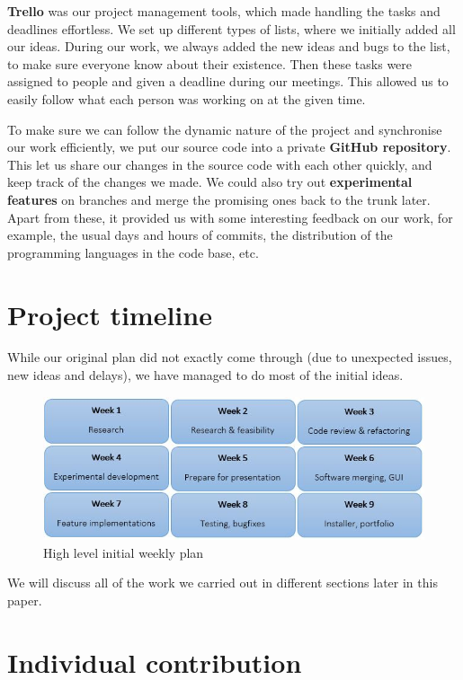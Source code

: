 \documentclass[a4paper, 11pt, article]{report}
\begin{document}
\textbf{Trello} was our project management tools, which made handling the tasks and deadlines effortless. We set up different types of lists, where we initially added all our ideas. During our work, we always added the new ideas and bugs to the list, to make sure everyone know about their existence. Then these tasks were assigned to people and given a deadline during our meetings. This allowed us to easily follow what each person was working on at the given time.

To make sure we can follow the dynamic nature of the project and synchronise our work efficiently, we put our source code into a private \textbf{GitHub repository}. This let us share our changes in the source code with each other quickly, and keep track of the changes we made. We could also try out \textbf{experimental features} on branches and merge the promising ones back to the trunk later. Apart from these, it provided us with some interesting feedback on our work, for example, the usual days and hours of commits, the distribution of the programming languages in the code base, etc.

\section{Project timeline}

While our original plan did not exactly come through (due to unexpected issues, new ideas and delays), we have managed to do most of the initial ideas.

\begin{figure}[H]
\includegraphics[width=12.8cm]{images/weeklyplan}
\caption{High level initial weekly plan}
\centering
\end{figure}

We will discuss all of the work we carried out in different sections later in this paper.

\section{Individual contribution}
\end{document}
